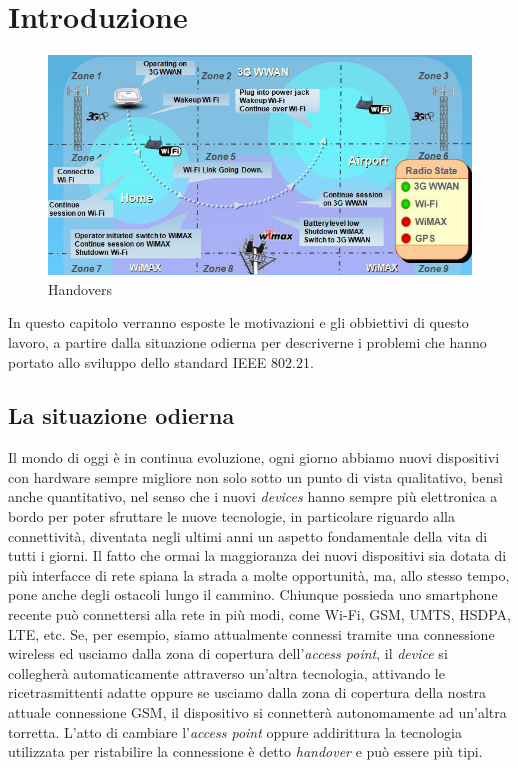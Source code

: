 \chapter{Introduzione}

\begin{figure}[h!]
\centering
\includegraphics[scale=0.5]{handovers.jpg}
\caption{Handovers}
\end{figure}

In questo capitolo verranno esposte le motivazioni e gli obbiettivi di questo lavoro, a partire dalla situazione odierna per descriverne i problemi che hanno portato allo sviluppo dello standard IEEE 802.21.


\section{La situazione odierna}
Il mondo di oggi è in continua evoluzione, ogni giorno abbiamo nuovi dispositivi con hardware sempre migliore non solo sotto un punto di vista qualitativo, bensì anche quantitativo, nel senso che i nuovi {\em devices} hanno sempre più elettronica a bordo per poter sfruttare le nuove tecnologie, in particolare riguardo alla connettività, diventata negli ultimi anni un aspetto fondamentale della vita di tutti i giorni. Il fatto che ormai la maggioranza dei nuovi dispositivi sia dotata di più interfacce di rete spiana la strada a molte opportunità, ma, allo stesso tempo, pone anche degli ostacoli lungo il cammino.
Chiunque possieda uno smartphone recente può connettersi alla rete in più modi, come Wi-Fi, GSM, UMTS, HSDPA, LTE, etc. Se, per esempio, siamo attualmente connessi tramite una connessione wireless ed usciamo dalla zona di copertura dell'{\em access point}, il {\em device} si collegherà automaticamente attraverso un'altra tecnologia, attivando le ricetrasmittenti adatte oppure se usciamo dalla zona di copertura della nostra attuale connessione GSM, il dispositivo si connetterà autonomamente ad un'altra torretta. L'atto di cambiare l'{\em access point} oppure addirittura la tecnologia utilizzata per ristabilire la connessione è detto {\em handover} e può essere più tipi.

